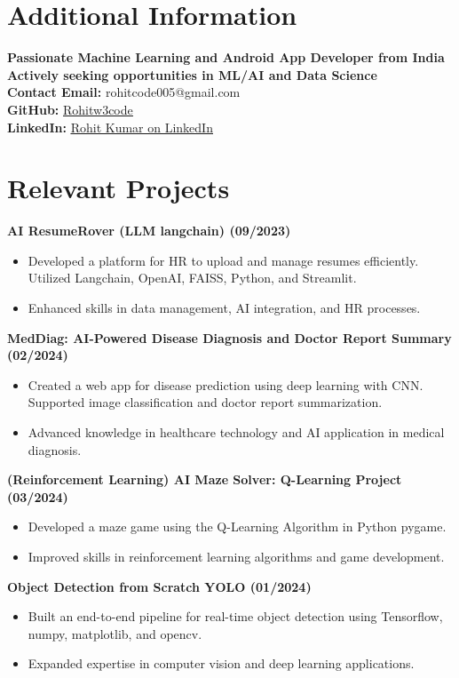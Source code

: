 \documentclass{article}
\begin{document}
\section*{Additional Information}
\textbf{Passionate Machine Learning and Android App Developer from India} \\
\textbf{Actively seeking opportunities in ML/AI and Data Science} \\
\textbf{Contact Email:} rohitcode005@gmail.com \\
\textbf{GitHub:} \textcolor{myblue}{\underline{\href{https://github.com/Rohitw3code}{Rohitw3code}}} \\
\textbf{LinkedIn:} \textcolor{myblue}{\underline{\href{https://www.linkedin.com/in/rohit-kumar-66522518a/}{Rohit Kumar on LinkedIn}}}

\section*{Relevant Projects}
\textbf{AI ResumeRover (LLM langchain) (09/2023)}
\begin{itemize}
    \item Developed a platform for HR to upload and manage resumes efficiently. Utilized Langchain, OpenAI, FAISS, Python, and Streamlit.
    \item Enhanced skills in data management, AI integration, and HR processes.
\end{itemize}

\textbf{MedDiag: AI-Powered Disease Diagnosis and Doctor Report Summary (02/2024)}
\begin{itemize}
    \item Created a web app for disease prediction using deep learning with CNN. Supported image classification and doctor report summarization.
    \item Advanced knowledge in healthcare technology and AI application in medical diagnosis.
\end{itemize}

\textbf{(Reinforcement Learning) AI Maze Solver: Q-Learning Project (03/2024)}
\begin{itemize}
    \item Developed a maze game using the Q-Learning Algorithm in Python pygame.
    \item Improved skills in reinforcement learning algorithms and game development.
\end{itemize}

\textbf{Object Detection from Scratch YOLO (01/2024)}
\begin{itemize}
    \item Built an end-to-end pipeline for real-time object detection using Tensorflow, numpy, matplotlib, and opencv.
    \item Expanded expertise in computer vision and deep learning applications.
\end{itemize}
\end{document}
